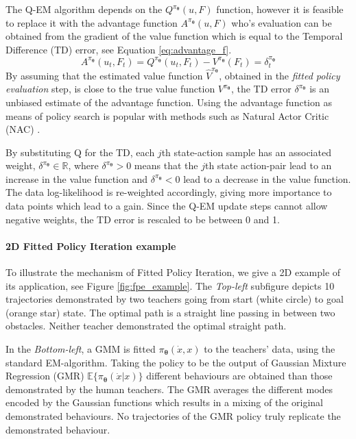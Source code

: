 \documentclass[final,5p,times,twocolumn]{elsarticle}
\newcommand{\X}{x}
\newcommand{\U}{\dot{x}}
\newcommand{\Param}{\boldsymbol{\theta}}
\begin{document}
The Q-EM algorithm depends on the $Q^{\pi_{\Param}}(u,F)$ function, however it is feasible to replace it with the 
advantage function $A^{\pi_{\Param}}(u,F)$ who's evaluation can be obtained from the gradient of the value function 
which is equal to the Temporal Difference (TD) error, see Equation \ref{eq:advantage_f}.
\begin{equation}\label{eq:advantage_f}
 A^{\pi_{\Param}}(u_t,F_t) =  Q^{\pi_{\Param}}(u_t,F_t) - V^{\pi_{\Param}}(F_t) = \delta^{\pi_{\Param}}_t
\end{equation}
By assuming that the estimated value function $\hat{V}^{\pi_{\Param}}$, obtained in the \textit{fitted policy evaluation} step, 
is close to the true value function $V^{\pi_{\Param}}$, the TD error $\delta^{\pi_{\Param}}$ is an unbiased estimate of the advantage function. Using the 
advantage function as means of policy search is popular with methods such as Natural Actor Critic (NAC) \cite{peter_nac_2008}.

By substituting Q for the TD, each $j$th state-action sample has an associated weight, $\delta^{\pi_{\Param}} \in \mathbb{R}$, 
where $\delta^{\pi_{\Param}} > 0$ means that the 
$j$th state action-pair lead to an increase in the value function and $\delta^{\pi_{\Param}} < 0$ lead to 
a decrease in the value function. The data log-likelihood is re-weighted accordingly, giving more importance to data points which lead to a gain. Since 
the Q-EM update steps cannot allow negative weights, the TD error is rescaled to be between 0 and 1. 


\paragraph{2D Fitted Policy Iteration example}

To illustrate the mechanism of Fitted Policy Iteration, we give a 2D example 
of its application, see Figure \ref{fig:fpe_example}. The \textit{Top-left} subfigure
depicts 10 trajectories demonstrated by two teachers going from start (white circle) to goal (orange star) state. 
The optimal path is a straight line passing in between two obstacles. 
Neither teacher demonstrated the optimal straight path. 

In the \textit{Bottom-left}, a GMM is fitted $\pi_{\Param}(\U,\X)$ to the teachers' data, using the standard EM-algorithm.
Taking the policy to be the output of Gaussian Mixture Regression (GMR) $\mathbb{E}\{\pi_{\Param}(\U|\X)\}$ different
behaviours are obtained than those demonstrated by the human teachers. The GMR averages the different modes encoded by the Gaussian functions 
which results in a mixing of the original demonstrated behaviours. No trajectories of the GMR policy truly replicate 
the demonstrated behaviour. 
\end{document}
